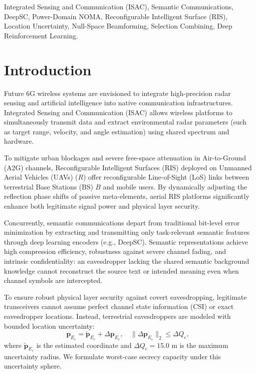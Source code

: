 \documentclass[journal,onecolumn]{IEEEtran}
\begin{document}
\begin{IEEEkeywords}
Integrated Sensing and Communication (ISAC), Semantic Communications, DeepSC, Power-Domain NOMA, Reconfigurable Intelligent Surface (RIS), Location Uncertainty, Null-Space Beamforming, Selection Combining, Deep Reinforcement Learning.
\end{IEEEkeywords}

\IEEEpeerreviewmaketitle

\section{Introduction}
Future 6G wireless systems are envisioned to integrate high-precision radar sensing and artificial intelligence into native communication infrastructures. Integrated Sensing and Communication (ISAC) allows wireless platforms to simultaneously transmit data and extract environmental radar parameters (such as target range, velocity, and angle estimation) using shared spectrum and hardware.

To mitigate urban blockages and severe free-space attenuation in Air-to-Ground (A2G) channels, Reconfigurable Intelligent Surfaces (RIS) deployed on Unmanned Aerial Vehicles (UAVs) ($R$) offer reconfigurable Line-of-Sight (LoS) links between terrestrial Base Stations (BS) $B$ and mobile users. By dynamically adjusting the reflection phase shifts of passive meta-elements, aerial RIS platforms significantly enhance both legitimate signal power and physical layer security.

Concurrently, semantic communications depart from traditional bit-level error minimization by extracting and transmitting only task-relevant semantic features through deep learning encoders (e.g., DeepSC). Semantic representations achieve high compression efficiency, robustness against severe channel fading, and intrinsic confidentiality: an eavesdropper lacking the shared semantic background knowledge cannot reconstruct the source text or intended meaning even when channel symbols are intercepted.

To ensure robust physical layer security against covert eavesdropping, legitimate transceivers cannot assume perfect channel state information (CSI) or exact eavesdropper locations. Instead, terrestrial eavesdroppers are modeled with bounded location uncertainty:
\begin{equation}
    \mathbf{p}_{E_e} = \widetilde{\mathbf{p}}_{E_e} + \Delta\mathbf{p}_{E_e}, \quad \|\Delta\mathbf{p}_{E_e}\|_2 \le \Delta Q_e,
\end{equation}
where $\widetilde{\mathbf{p}}_{E_e}$ is the estimated coordinate and $\Delta Q_e = 15.0\text{ m}$ is the maximum uncertainty radius. We formulate worst-case secrecy capacity under this uncertainty sphere.
\end{document}
